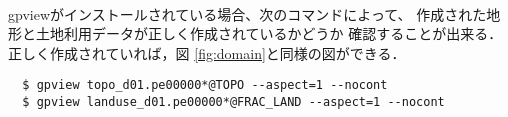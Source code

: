 \vspace{1cm}
 \hrulefill \\
gpviewがインストールされている場合、次のコマンドによって、
作成された地形と土地利用データが正しく作成されているかどうか
確認することが出来る．正しく作成されていれば，図 \ref{fig:domain}と同様の図ができる．
\begin{verbatim}
  $ gpview topo_d01.pe00000*@TOPO --aspect=1 --nocont
  $ gpview landuse_d01.pe00000*@FRAC_LAND --aspect=1 --nocont
\end{verbatim}

